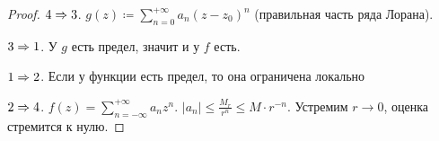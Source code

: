\begin{proof}
    $4 \Rightarrow 3$.
    $g(z) \coloneqq \sum\limits_{n=0}^{+\infty} a_n(z-z_0)^n$ (правильная
    часть ряда Лорана).

    $3 \Rightarrow 1$. У $g$ есть предел, значит и у $f$ есть.

    $1 \Rightarrow 2$. Если у функции есть предел, то она ограничена локально

    $2 \Rightarrow 4$.
    $f(z) = \sum\limits_{n=-\infty}^{+\infty} a_nz^n$.
    $|a_n| \le \frac{M_r}{r^n} \le M \cdot r^{-n}$.
    Устремим $r \to 0$, оценка стремится к нулю.
\end{proof}

\newpage

